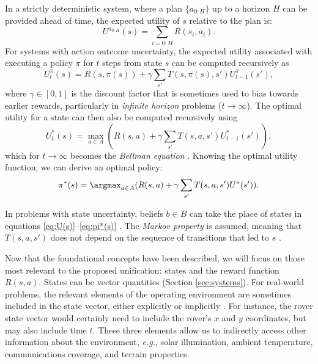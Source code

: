 In a strictly deterministic system, where a plan $\{a_{0:H}\}$ up to a horizon $H$ can be provided ahead of time, the expected utility of $s$ relative to the plan is:
\begin{equation}
U^{a_{0:H}}(s) = \sum_{i=0:H}R(s_i,a_i).
\label{eq:plan}
\end{equation}
For systems with action outcome uncertainty, the expected utility associated with executing a policy $\pi$ for $t$ steps from state $s$ can be computed recursively as
\begin{equation}
U_t^{\pi}(s)=R(s,\pi(s))+\gamma \sum_{s'} T(s,\pi(s),s')U^{\pi}_{t-1}(s'),
\label{eq:U(s)}
\end{equation}
where $\gamma \in [0,1]$ is the discount factor that is sometimes used to bias towards earlier rewards, particularly in \textit{infinite horizon} problems ($t \rightarrow \infty$). The optimal utility for a state can then also be computed recursively using
\begin{equation}
U_t^*(s)=\max_{a \in A} (R(s,a)+\gamma \sum_{s'} T(s,a,s')U^*_{t-1}(s')),
\label{eq:U*(s)}
\end{equation}
which for $t \rightarrow \infty$ becomes the \textit{Bellman equation} \cite{Bellman1957}. Knowing the optimal utility function, we can derive an optimal policy:
\begin{equation}
\pi^*(s) = \argmax_{a \in A} (R(s,a)+\gamma \sum_{s'} T(s,a,s')U^*(s')).
\label{eq:pi*(s)}
\end{equation}

In problems with state uncertainty, beliefs $b \in B$ can take the place of states in equations \ref{eq:U(s)}--\ref{eq:pi*(s)} \cite{Kaelbling1998}. The \textit{Markov property} is assumed, meaning that $T(s,a,s')$ does not depend on the sequence of transitions that led to $s$ \cite{Kemeny1983}.

Now that the foundational concepts have been described, we will focus on those most relevant to the proposed unification: states and the reward function $R(s,a)$. States can be vector quantities (Section \ref{sec:systems}). For real-world problems, the relevant elements of the operating environment are sometimes included in the state vector, either explicitly or implicitly \cite{Ragi2014}. For instance, the rover state vector would certainly need to include the rover's $x$ and $y$ coordinates, but may also include time $t$. These three elements allow us to indirectly access other information about the environment, \textit{e.g.}, solar illumination, ambient temperature, communications coverage, and terrain properties.

